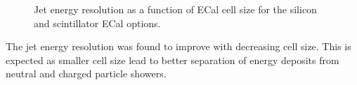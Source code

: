 \begin{figure}
\centering
{}
 \hfill
\caption[Jet energy resolution as a function of ECal cell size.]{Jet energy resolution as a function of ECal cell size for the silicon and scintillator ECal options.}
\label{fig:ecalcellsize}
\end{figure}

The jet energy resolution was found to improve with decreasing cell size.  This is expected as smaller cell size lead to better separation of energy deposits from neutral and charged particle showers.  

